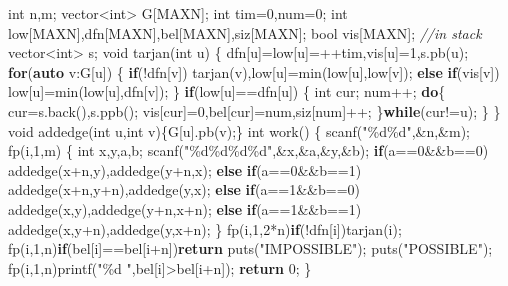 \documentclass[
]{article}
\newenvironment{Shaded}{}{}
\newcommand{\CommentTok}[1]{\textcolor[rgb]{0.38,0.63,0.69}{\textit{#1}}}
\newcommand{\ControlFlowTok}[1]{\textcolor[rgb]{0.00,0.44,0.13}{\textbf{#1}}}
\newcommand{\DataTypeTok}[1]{\textcolor[rgb]{0.56,0.13,0.00}{#1}}
\newcommand{\DecValTok}[1]{\textcolor[rgb]{0.25,0.63,0.44}{#1}}
\newcommand{\KeywordTok}[1]{\textcolor[rgb]{0.00,0.44,0.13}{\textbf{#1}}}
\newcommand{\NormalTok}[1]{#1}
\newcommand{\SpecialCharTok}[1]{\textcolor[rgb]{0.25,0.44,0.63}{#1}}
\newcommand{\StringTok}[1]{\textcolor[rgb]{0.25,0.44,0.63}{#1}}
\begin{document}
\begin{Shaded}
\begin{Highlighting}[]
\DataTypeTok{int}\NormalTok{ n,m;}
\NormalTok{vector\textless{}}\DataTypeTok{int}\NormalTok{\textgreater{} G[MAXN];}
\DataTypeTok{int}\NormalTok{ tim=}\DecValTok{0}\NormalTok{,num=}\DecValTok{0}\NormalTok{;}
\DataTypeTok{int}\NormalTok{ low[MAXN],dfn[MAXN],bel[MAXN],siz[MAXN];}
\DataTypeTok{bool}\NormalTok{ vis[MAXN]; }\CommentTok{//in stack}
\NormalTok{vector\textless{}}\DataTypeTok{int}\NormalTok{\textgreater{} s;}
\DataTypeTok{void}\NormalTok{ tarjan(}\DataTypeTok{int}\NormalTok{ u)}
\NormalTok{\{}
\NormalTok{    dfn[u]=low[u]=++tim,vis[u]=}\DecValTok{1}\NormalTok{,s.pb(u);    }
    \ControlFlowTok{for}\NormalTok{(}\KeywordTok{auto}\NormalTok{ v:G[u])}
\NormalTok{    \{}
        \ControlFlowTok{if}\NormalTok{(!dfn[v]) tarjan(v),low[u]=min(low[u],low[v]);}
        \ControlFlowTok{else} \ControlFlowTok{if}\NormalTok{(vis[v]) low[u]=min(low[u],dfn[v]);}
\NormalTok{    \}}
    \ControlFlowTok{if}\NormalTok{(low[u]==dfn[u])}
\NormalTok{    \{}
        \DataTypeTok{int}\NormalTok{ cur; num++;}
        \ControlFlowTok{do}\NormalTok{\{}
\NormalTok{            cur=s.back(),s.ppb();}
\NormalTok{            vis[cur]=}\DecValTok{0}\NormalTok{,bel[cur]=num,siz[num]++;}
\NormalTok{        \}}\ControlFlowTok{while}\NormalTok{(cur!=u);}
\NormalTok{    \}}
\NormalTok{\}}
\DataTypeTok{void}\NormalTok{ addedge(}\DataTypeTok{int}\NormalTok{ u,}\DataTypeTok{int}\NormalTok{ v)\{G[u].pb(v);\}}
\DataTypeTok{int}\NormalTok{ work()}
\NormalTok{\{}
\NormalTok{    scanf(}\StringTok{"}\SpecialCharTok{\%d\%d}\StringTok{"}\NormalTok{,\&n,\&m);}
\NormalTok{    fp(i,}\DecValTok{1}\NormalTok{,m)}
\NormalTok{    \{}
        \DataTypeTok{int}\NormalTok{ x,y,a,b;}
\NormalTok{        scanf(}\StringTok{"}\SpecialCharTok{\%d\%d\%d\%d}\StringTok{"}\NormalTok{,\&x,\&a,\&y,\&b);}
        \ControlFlowTok{if}\NormalTok{(a==}\DecValTok{0}\NormalTok{\&\&b==}\DecValTok{0}\NormalTok{)      addedge(x+n,y),addedge(y+n,x);}
        \ControlFlowTok{else} \ControlFlowTok{if}\NormalTok{(a==}\DecValTok{0}\NormalTok{\&\&b==}\DecValTok{1}\NormalTok{) addedge(x+n,y+n),addedge(y,x);}
        \ControlFlowTok{else} \ControlFlowTok{if}\NormalTok{(a==}\DecValTok{1}\NormalTok{\&\&b==}\DecValTok{0}\NormalTok{) addedge(x,y),addedge(y+n,x+n);}
        \ControlFlowTok{else} \ControlFlowTok{if}\NormalTok{(a==}\DecValTok{1}\NormalTok{\&\&b==}\DecValTok{1}\NormalTok{) addedge(x,y+n),addedge(y,x+n);}
\NormalTok{    \}}
\NormalTok{    fp(i,}\DecValTok{1}\NormalTok{,}\DecValTok{2}\NormalTok{*n)}\ControlFlowTok{if}\NormalTok{(!dfn[i])tarjan(i);}
\NormalTok{    fp(i,}\DecValTok{1}\NormalTok{,n)}\ControlFlowTok{if}\NormalTok{(bel[i]==bel[i+n])}\ControlFlowTok{return}\NormalTok{ puts(}\StringTok{"IMPOSSIBLE"}\NormalTok{);}
\NormalTok{    puts(}\StringTok{"POSSIBLE"}\NormalTok{);}
\NormalTok{    fp(i,}\DecValTok{1}\NormalTok{,n)printf(}\StringTok{"}\SpecialCharTok{\%d}\StringTok{ "}\NormalTok{,bel[i]\textgreater{}bel[i+n]);}
    \ControlFlowTok{return} \DecValTok{0}\NormalTok{;}
\NormalTok{\}}
\end{Highlighting}
\end{Shaded}
\end{document}
